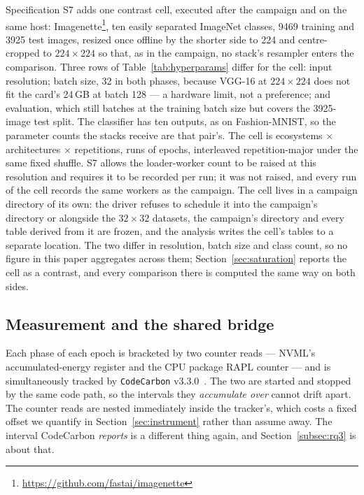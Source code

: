 Specification S7 adds one contrast cell, executed
after the campaign and on the same host:
Imagenette\footnote{\url{https://github.com/fastai/imagenette}}, ten easily
separated ImageNet classes, \num{9469} training and \num{3925} test images, resized once offline by the
shorter side to 224 and centre-cropped to $224\times224$ so that, as in the
campaign, no stack's resampler enters the comparison. Three rows of
Table~\ref{tab:hyperparams} differ for the cell: input resolution; batch size,
32 in both phases, because VGG-16 at $224\times224$ does not fit the card's
24\,GB at batch 128 --- a hardware limit, not a preference; and evaluation, which
still batches at the training batch size but covers the \num{3925}-image test split.
The classifier has ten outputs, as on Fashion-MNIST, so the parameter counts the
stacks receive are that pair's. The
cell is \vSatEcosystems{} ecosystems $\times$ \vSatModels{} architectures
$\times$ \vSatReps{} repetitions, \vSatRuns{} runs of \vSatEpochs{} epochs,
interleaved repetition-major under the same fixed shuffle. S7 allows the
loader-worker count to be raised at this resolution and requires it to be
recorded per run; it was not raised, and every run of the cell records the same
\vSatLoaderThreads{} workers as the campaign. The cell lives in a campaign directory of its own:
the driver refuses to schedule it into the campaign's directory or alongside the
$32\times32$ datasets, the campaign's directory and every table derived from it
are frozen, and the analysis writes the cell's tables to a separate location. The
two differ in resolution, batch size and class count, so no figure in this paper
aggregates across them; Section~\ref{sec:saturation} reports the cell as a
contrast, and every comparison there is computed the same way on both sides.

\subsection{Measurement and the shared bridge}
\label{app:bridge}

Each phase of each epoch is bracketed by two counter reads --- NVML's
accumulated-energy register and the CPU package RAPL counter --- and is
simultaneously tracked by \texttt{CodeCarbon} v3.3.0~\citep{codecarbon}. The two
are started and stopped by the same code path, so the intervals they
\emph{accumulate over} cannot drift apart. The counter reads are nested
immediately inside the tracker's, which costs a fixed offset we quantify in
Section~\ref{sec:instrument} rather than assume away. The interval CodeCarbon
\emph{reports} is a different thing again, and Section~\ref{subsec:rq3} is
about that.

